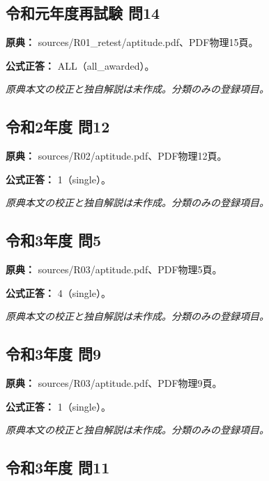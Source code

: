 \subsection{令和元年度再試験 問14}
\label{q:r01-ret-apt-14}

\noindent\textbf{原典：} sources/R01\_retest/aptitude.pdf、PDF物理15頁。

\textbf{公式正答：} ALL（all\_awarded）。

\par\textit{原典本文の校正と独自解説は未作成。分類のみの登録項目。}

\subsection{令和2年度 問12}
\label{q:r02-reg-apt-12}

\noindent\textbf{原典：} sources/R02/aptitude.pdf、PDF物理12頁。

\textbf{公式正答：} 1（single）。

\par\textit{原典本文の校正と独自解説は未作成。分類のみの登録項目。}

\subsection{令和3年度 問5}
\label{q:r03-reg-apt-05}

\noindent\textbf{原典：} sources/R03/aptitude.pdf、PDF物理5頁。

\textbf{公式正答：} 4（single）。

\par\textit{原典本文の校正と独自解説は未作成。分類のみの登録項目。}

\subsection{令和3年度 問9}
\label{q:r03-reg-apt-09}

\noindent\textbf{原典：} sources/R03/aptitude.pdf、PDF物理9頁。

\textbf{公式正答：} 1（single）。

\par\textit{原典本文の校正と独自解説は未作成。分類のみの登録項目。}

\subsection{令和3年度 問11}
\label{q:r03-reg-apt-11}

